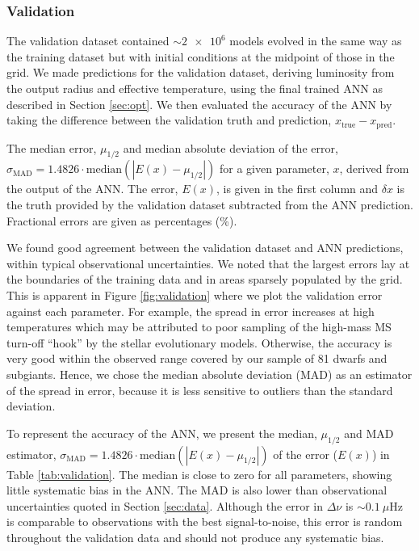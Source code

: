 \documentclass[a4paper,fleqn,usenatbib]{mnras}
\newcommand{\dnu}{\ensuremath{\Delta\nu}}
\begin{document}
\subsubsection{Validation}\label{sec:test}

The validation dataset contained $\sim \num{2e6}$ models evolved in the same way as the training dataset but with initial conditions at the midpoint of those in the grid. We made predictions for the validation dataset, deriving luminosity from the output radius and effective temperature, using the final trained ANN as described in Section \ref{sec:opt}. We then evaluated the accuracy of the ANN by taking the difference between the validation truth and prediction, $x_\mathrm{true} - x_\mathrm{pred}$. 

\begin{table}
	\centering
	\caption{The median error, $\mu_{1/2}$ and median absolute deviation of the error, $\sigma_\mathrm{MAD} = 1.4826\cdot\mathrm{median}(|E(x) - \mu_{1/2}|)$ for a given parameter, $x$, derived from the output of the ANN. The error, $E(x)$, is given in the first column and $\delta x$ is the truth provided by the validation dataset subtracted from the ANN prediction. Fractional errors are given as percentages (\%).}
	\label{tab:validation}
        
\end{table}

We found good agreement between the validation dataset and ANN predictions, within typical observational uncertainties. We noted that the largest errors lay at the boundaries of the training data and in areas sparsely populated by the grid. This is apparent in Figure \ref{fig:validation} where we plot the validation error against each parameter. For example, the spread in error increases at high temperatures which may be attributed to poor sampling of the high-mass MS turn-off ``hook'' by the stellar evolutionary models. Otherwise, the accuracy is very good within the observed range covered by our sample of 81 dwarfs and subgiants. Hence, we chose the median absolute deviation (MAD) as an estimator of the spread in error, because it is less sensitive to outliers than the standard deviation.

To represent the accuracy of the ANN, we present the median, $\mu_{1/2}$ and MAD estimator, $\sigma_\mathrm{MAD} = 1.4826\cdot\mathrm{median}(|E(x) - \mu_{1/2}|)$ of the error ($E(x)$) in Table \ref{tab:validation}. The median is close to zero for all parameters, showing little systematic bias in the ANN. The MAD is also lower than observational uncertainties quoted in Section \ref{sec:data}. Although the error in $\dnu$ is $\sim \SI{0.1}{\mu\Hz}$ is comparable to observations with the best signal-to-noise, this error is random throughout the validation data and should not produce any systematic bias.
\end{document}

